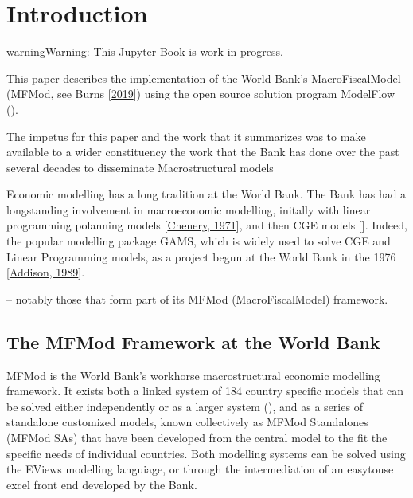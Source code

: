 \documentclass[letterpaper,10pt,english]{jupyterBook}
\begin{document}
\chapter{Introduction}
\label{\detokenize{content/01_Introduction/Introduction:introduction}}\label{\detokenize{content/01_Introduction/Introduction::doc}}
\begin{sphinxadmonition}{warning}{Warning:}
\sphinxAtStartPar
This Jupyter Book is work in progress.
\end{sphinxadmonition}

\sphinxAtStartPar
This paper describes the implementation of the World Bank’s MacroFiscalModel (MFMod, see Burns  {[}\hyperlink{cite.content/99_BackMatter/References:id15}{2019}{]}) using the open source solution program ModelFlow ().

\sphinxAtStartPar
The impetus for this paper and the work that it summarizes was to make available to a wider constituency the work that the Bank has done over the past several decades to disseminate Macro\sphinxhyphen{}structural models%
\begin{footnote}[1]\sphinxAtStartFootnote
Economic modelling has a long tradition at the World Bank.  The Bank has had a long\sphinxhyphen{}standing involvement in macroeconomic modelling, initally with linear programming polanning models {[}\hyperlink{cite.content/99_BackMatter/References:id21}{Chenery, 1971}{]}, and then CGE models {[}{]}. Indeed, the popular modelling package GAMS, which is widely used to solve CGE and Linear Programming models,  as a project begun at the World Bank in the 1976 {[}\hyperlink{cite.content/99_BackMatter/References:id20}{Addison, 1989}{]}.
%
\end{footnote} – notably those that form part of its MFMod (MacroFiscalModel) framework.


\section{The MFMod Framework at the World Bank}
\label{\detokenize{content/01_Introduction/Introduction:the-mfmod-framework-at-the-world-bank}}
\sphinxAtStartPar
MFMod is the World Bank’s work\sphinxhyphen{}horse macro\sphinxhyphen{}structural economic modelling framework. It exists both a linked system of 184 country specific models that can be solved either independently or as a larger system (), and as a series of  standalone customized models, known collectively as MFMod Standalones (MFMod SAs) that have been developed from the central model to the fit the specific needs of individual countries. Both modelling systems can be solved using the EViews modelling languiage, or through the intermediation of an easy\sphinxhyphen{}to\sphinxhyphen{}use excel front end developed by the Bank.
\end{document}
